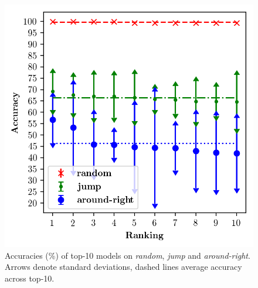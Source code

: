 
\begin{figure}[tb]
    \includegraphics[width=.4\textwidth,keepaspectratio]{figures/accuracies_all_splits.png}
    \centering
    \caption{Accuracies (\%) of top-10 models on \emph{random}, \emph{jump} and \emph{around-right}. Arrows
      denote standard deviations, dashed lines average accuracy across top-10.
      }
    \label{fig:exp1}
\end{figure}

